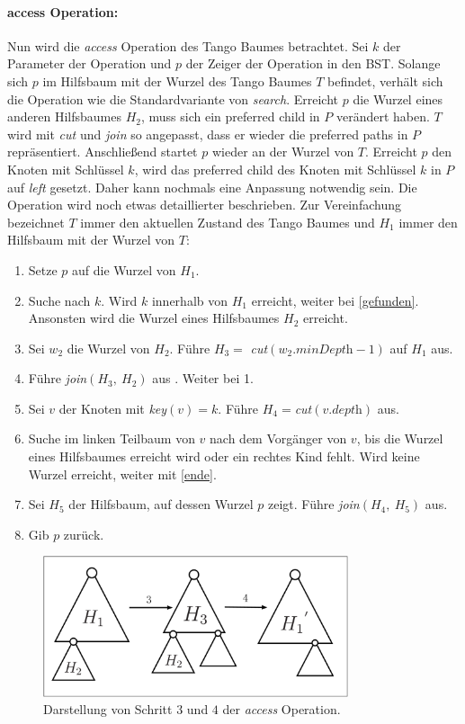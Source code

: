 \documentclass[a4paper,12pt]{article}
\begin{document}
\paragraph{access Operation:}
Nun wird die \textit{access} Operation des Tango Baumes betrachtet. Sei $k$ der Parameter der Operation und $p$ der Zeiger der Operation in den BST. Solange sich $p$ im Hilfsbaum mit der Wurzel des Tango Baumes $T$ befindet, verhält sich die Operation wie die Standardvariante von \textit{search}. Erreicht $p$ die Wurzel eines anderen Hilfsbaumes $H_2$, muss sich ein preferred child in $P$ verändert haben. $T$ wird mit \textit{cut} und \textit{join} so angepasst, dass er wieder die preferred paths in $P$ repräsentiert. Anschließend startet $p$ wieder an der Wurzel von $T$. Erreicht $p$ den Knoten mit Schlüssel $k$, wird das preferred child des Knoten mit Schlüssel $k$ in $P$ auf \textit{left} gesetzt. Daher kann nochmals eine Anpassung notwendig sein. Die Operation wird noch etwas detaillierter beschrieben. Zur Vereinfachung bezeichnet $T$ immer den aktuellen Zustand des Tango Baumes und $H_1$ immer den Hilfsbaum mit der Wurzel von $T$:
\begin{enumerate}
	\item Setze $p$ auf die Wurzel von $H_1$.
	\item Suche nach $k$. Wird $k$ innerhalb von $H_1$ erreicht, weiter bei \ref{gefunden}. Ansonsten wird die Wurzel eines Hilfsbaumes $H_2$ erreicht.
	\item Sei $w_2$ die Wurzel von $H_2$. Führe $H_3 =$ \textit{cut}$\left(w_2.\textit{minDepth} - 1\right)$ auf $H_1$ aus.
	\item Führe \textit{join}$\left(H_3, ~H_2\right)$ aus . Weiter bei 1.
	\item \label{gefunden} Sei $v$ der Knoten mit \textit{key}$\left(v\right) = k$. Führe $H_4=$\textit{cut}$ \left(v.\textit{depth}\right)$ aus. 
	\item Suche im linken Teilbaum von $v$ nach dem Vorgänger von $v$, bis die Wurzel eines Hilfsbaumes erreicht wird oder ein rechtes Kind fehlt. Wird keine Wurzel erreicht, weiter mit \ref{ende}.
	\item Sei $H_5$ der Hilfsbaum, auf dessen Wurzel $p$ zeigt. Führe \textit{join}$\left(H_4, ~H_5\right)$ aus.
	\item \label{ende} Gib $p$ zurück.
\end{enumerate}
\begin{figure}[H]
	\centering
	\includegraphics[width=0.8\textwidth]{"Medien/Tango/cutJoin"}
	\caption{Darstellung von Schritt $3$ und $4$ der \textit{access} Operation. }
	\label{fig:cutJoin}
\end{figure}
\end{document}

